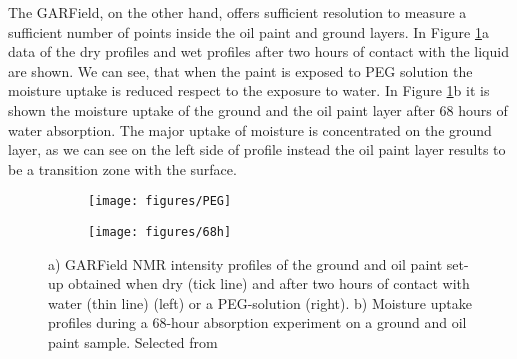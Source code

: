 \documentclass[a4paper,11pt]{report}
\begin{document}
  
  
  
  
  The GARField, on the other hand, offers sufficient resolution to measure a sufficient number of points inside the oil paint and ground layers. In Figure \ref{Garfield}a data of the dry profiles and wet profiles after two hours of contact with the liquid are shown. We can see, that when the paint is exposed to PEG solution the moisture uptake is reduced respect to the exposure to water. In Figure \ref{Garfield}b it is shown the moisture uptake of the ground and the oil paint layer after 68 hours of water absorption. The major uptake of moisture is concentrated on   the ground layer, as we can see on the left side of profile instead the oil paint layer results to be a transition zone with the surface. 
  
   \begin{figure}[h]

\begin{subfigure}{0.5\textwidth}
\texttt{[image: figures/PEG]} 
\caption{}

\end{subfigure}
\begin{subfigure}{0.5\textwidth}
\texttt{[image: figures/68h]}
\caption{}

\end{subfigure}
 


\caption{ a) GARField NMR intensity profiles of the ground and oil paint set-up obtained when dry (tick line) and after two hours of contact with water (thin line) (left) or a PEG-solution (right). b) Moisture uptake profiles during a 68-hour absorption experiment on a ground and oil paint sample. Selected from \cite{duepaint}}\label{Garfield}
\end{figure}

  
  
\end{document}
